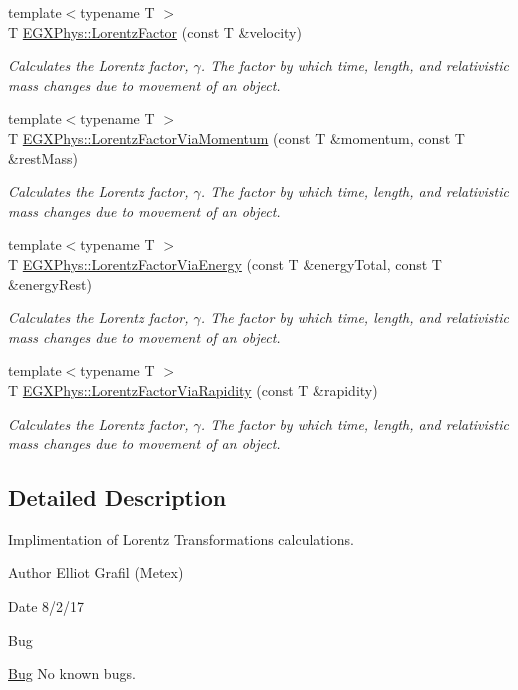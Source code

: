 \begin{DoxyCompactItemize}
\item 
{\footnotesize template$<$typename T $>$ }\\T \hyperlink{group___relativity_ga5f9b11c1f4c3ae26a7e64f02c22d5a75}{E\+G\+X\+Phys\+::\+Lorentz\+Factor} (const T \&velocity)
\begin{DoxyCompactList}\small\item\em Calculates the Lorentz factor, $\gamma$. The factor by which time, length, and relativistic mass changes due to movement of an object. \end{DoxyCompactList}\item 
{\footnotesize template$<$typename T $>$ }\\T \hyperlink{group___relativity_ga1ea24128654ac333dd843afdd5c003b7}{E\+G\+X\+Phys\+::\+Lorentz\+Factor\+Via\+Momentum} (const T \&momentum, const T \&rest\+Mass)
\begin{DoxyCompactList}\small\item\em Calculates the Lorentz factor, $\gamma$. The factor by which time, length, and relativistic mass changes due to movement of an object. \end{DoxyCompactList}\item 
{\footnotesize template$<$typename T $>$ }\\T \hyperlink{group___relativity_ga601de8c039be89a9abea22bc459436c9}{E\+G\+X\+Phys\+::\+Lorentz\+Factor\+Via\+Energy} (const T \&energy\+Total, const T \&energy\+Rest)
\begin{DoxyCompactList}\small\item\em Calculates the Lorentz factor, $\gamma$. The factor by which time, length, and relativistic mass changes due to movement of an object. \end{DoxyCompactList}\item 
{\footnotesize template$<$typename T $>$ }\\T \hyperlink{group___relativity_ga8064f5bce1d2ca5f7bc39d95ba4d2dd9}{E\+G\+X\+Phys\+::\+Lorentz\+Factor\+Via\+Rapidity} (const T \&rapidity)
\begin{DoxyCompactList}\small\item\em Calculates the Lorentz factor, $\gamma$. The factor by which time, length, and relativistic mass changes due to movement of an object. \end{DoxyCompactList}\end{DoxyCompactItemize}


\subsection{Detailed Description}
Implimentation of Lorentz Transformations calculations. 

\begin{DoxyAuthor}{Author}
Elliot Grafil (Metex) 
\end{DoxyAuthor}
\begin{DoxyDate}{Date}
8/2/17 
\end{DoxyDate}
\begin{DoxyRefDesc}{Bug}
\item[\hyperlink{bug__bug000042}{Bug}]No known bugs. \end{DoxyRefDesc}
